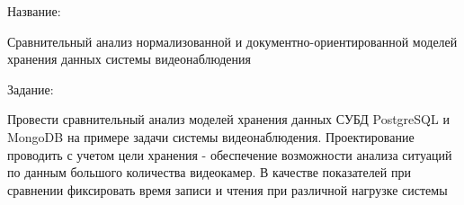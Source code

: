 Название:

Сравнительный анализ нормализованной и документно-ориентированной моделей хранения данных системы видеонаблюдения

Задание:

Провести сравнительный анализ моделей хранения данных СУБД PostgreSQL и MongoDB на примере задачи системы видеонаблюдения. Проектирование проводить с учетом цели хранения - обеспечение возможности анализа ситуаций по данным большого количества видеокамер. В качестве показателей при сравнении фиксировать время записи и чтения при различной нагрузке системы